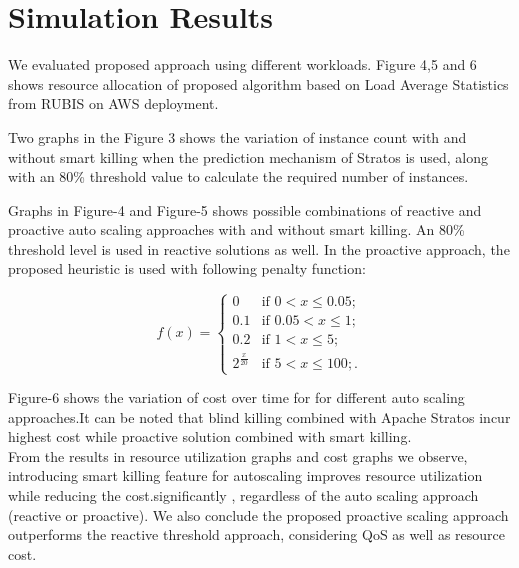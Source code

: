 \section{Simulation Results}
We evaluated proposed approach using different workloads. Figure 4,5 and 6 shows resource allocation of proposed algorithm based on Load Average Statistics from RUBIS on AWS deployment.

Two graphs in the Figure 3 shows the variation of instance count with and without smart killing when the prediction mechanism of Stratos is used, along with an 80\% threshold value to calculate the required number of instances.

Graphs in Figure-4  and Figure-5 shows possible combinations of reactive and proactive auto scaling approaches with and without smart killing. An 80\% threshold level is used in reactive solutions as well. In the proactive approach, the proposed heuristic is used with following penalty function:

$$f(x) = \begin{cases} 
0 & \text{if $0 < x \le 0.05$}; \\
0.1 & \text{if $0.05 < x \le 1$}; \\
0.2 & \text{if $1 < x \le 5$};\\
2^{\frac{x}{20}} & \text{if $5 < x \le 100$};.\end{cases} $$


Figure-6 shows the variation of cost over time for for different auto scaling approaches.It can be noted that blind killing combined with Apache Stratos incur highest cost while proactive solution combined with smart killing.\\

From the results in resource utilization graphs and cost graphs we observe, introducing smart killing feature for autoscaling  improves resource utilization while reducing the cost.significantly , regardless of the auto scaling approach (reactive or proactive). We also conclude the proposed proactive scaling approach outperforms the reactive threshold approach, considering QoS as well as resource cost.